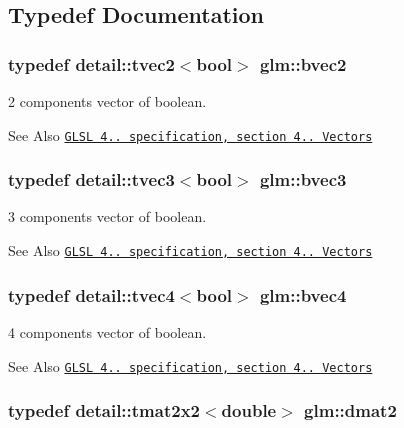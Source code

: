 \subsection{Typedef Documentation}
\hypertarget{group__core__types_ga0b5729ae4f7b2767a18bb96b7152c072}{
\subsubsection[{bvec2}]{\setlength{\rightskip}{0pt plus 5cm}typedef detail\-::tvec2$<$bool$>$ {\bf glm\-::bvec2}}}\label{group__core__types_ga0b5729ae4f7b2767a18bb96b7152c072}


2 components vector of boolean. 

\begin{DoxySeeAlso}{See Also}
\href{http://www.opengl.org/registry/doc/GLSLangSpec.4.20.8.pdf}{\tt G\-L\-S\-L 4.. specification, section 4.. Vectors} 
\end{DoxySeeAlso}
\hypertarget{group__core__types_gac192f5fbd7fcb78ca703d4684f323512}{
\subsubsection[{bvec3}]{\setlength{\rightskip}{0pt plus 5cm}typedef detail\-::tvec3$<$bool$>$ {\bf glm\-::bvec3}}}\label{group__core__types_gac192f5fbd7fcb78ca703d4684f323512}


3 components vector of boolean. 

\begin{DoxySeeAlso}{See Also}
\href{http://www.opengl.org/registry/doc/GLSLangSpec.4.20.8.pdf}{\tt G\-L\-S\-L 4.. specification, section 4.. Vectors} 
\end{DoxySeeAlso}
\hypertarget{group__core__types_ga8ec34c649bc4513202aff479486bbcea}{
\subsubsection[{bvec4}]{\setlength{\rightskip}{0pt plus 5cm}typedef detail\-::tvec4$<$bool$>$ {\bf glm\-::bvec4}}}\label{group__core__types_ga8ec34c649bc4513202aff479486bbcea}


4 components vector of boolean. 

\begin{DoxySeeAlso}{See Also}
\href{http://www.opengl.org/registry/doc/GLSLangSpec.4.20.8.pdf}{\tt G\-L\-S\-L 4.. specification, section 4.. Vectors} 
\end{DoxySeeAlso}
\hypertarget{group__core__types_gaa53909085d199392937e3933af5410a1}{
\subsubsection[{dmat2}]{\setlength{\rightskip}{0pt plus 5cm}typedef detail\-::tmat2x2$<$double$>$ {\bf glm\-::dmat2}}}\label{group__core__types_gaa53909085d199392937e3933af5410a1}


